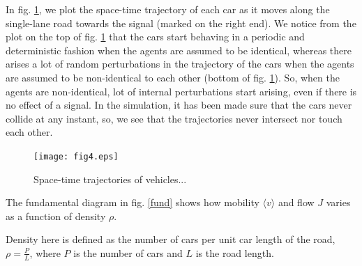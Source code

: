 \documentclass[conference]{IEEEtran}
\begin{document}
In fig. \ref{spacetime}, we plot the space-time trajectory of each car as it moves along the single-lane road towards the signal (marked on the right end). We notice from the plot on the top of fig. \ref{spacetime} that the cars start behaving in a periodic and deterministic fashion when the agents are assumed to be identical, whereas there arises a lot of random perturbations in the trajectory of the cars when the agents are assumed to be non-identical to each other (bottom of fig. \ref{spacetime}). So, when the agents are non-identical, lot of internal perturbations start arising, even if there is no effect of a signal. In the simulation, it has been made sure that the cars never collide at any instant, so, we see that the trajectories never intersect nor touch each other. %


\begin{figure}
{    \texttt{[image: fig4.eps]}}
    \caption{Space-time trajectories of vehicles...}

    \label{spacetime}
\end{figure}



The fundamental diagram in fig. \ref{fund} shows how mobility $\langle v \rangle$ and flow $J$ varies as a function of density $\rho$.

Density here is defined as the number of cars per unit car length of the road, $\rho=\frac{P}{L}$, where $P$ is the number of cars and $L$ is the road length.
\end{document}
